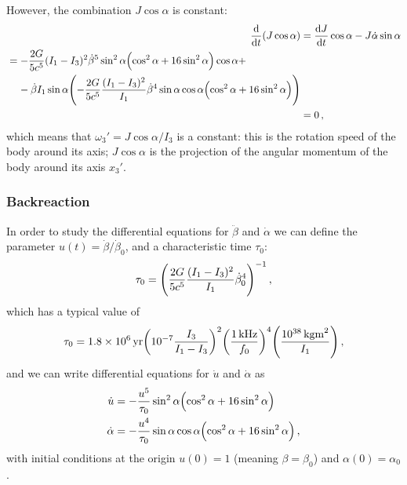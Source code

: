 \documentclass[main.tex]{subfiles}
\begin{document}
However, the combination \(J \cos \alpha \) is constant: 
%
\begin{align}
\dv{}{t} \qty(J \cos \alpha ) &= \dv{J}{t} \cos \alpha - J \dot{\alpha} \sin \alpha   \\
\begin{split}
&= - \frac{2G}{5c^{5}} (I_1-I_3)^2 \dot{\beta}^{5} \sin^2\alpha \qty(\cos^2\alpha  + 16 \sin^2\alpha ) \cos \alpha + \\
&\phantom{=}\ 
- \dot{\beta} I_1 \sin \alpha \qty(- \frac{2G}{5c^{5}} \frac{(I_1 - I_3 )^2}{I_1 } 
\dot{\beta}^{4} \sin \alpha \cos \alpha \qty(\cos^2\alpha + 16 \sin^2 \alpha ))
\end{split}  \\
&= 0
\,,
\end{align}
%
which means that \(\omega_{3}' = J \cos \alpha  / I_3 \) is a constant: this is the rotation speed of the body around its axis; \(J \cos \alpha \) is the projection of the angular momentum of the body around its axis \(x_3'\).


\subsubsection{Backreaction}

In order to study the differential equations for \(\ddot{\beta}\) and \(\dot{\alpha}\) we can define the parameter \(u(t) = \dot{\beta} / \dot{\beta}_{0}\), and a characteristic time \(\tau_0 \): 
%
\begin{align}
\tau_0  = \qty( \frac{2G}{5 c^{5}} \frac{(I_1 - I_3 )^2}{I_1  } \dot{\beta}_{0}^{4})^{-1}
\,,
\end{align}
%
which has a typical value of 
%
\begin{align}
\tau_0 = \SI{1.8e6}{yr} \qty(\num{e-7} \frac{I_3 }{I_1 - I_3 })^2 \qty( \frac{ \SI{1}{kHz}}{f_0 })^{4} \qty(\frac{\SI{e38}{kg m^2}}{I_1 })
\,,
\end{align}
%
and we can write differential equations for \(\dot{u}\) and \(\dot{\alpha}\) as 
%
\begin{align}
\dot{u} &= - \frac{u^{5}}{\tau_0 } \sin^2\alpha  \qty(\cos^2 \alpha + 16 \sin^2\alpha ) \\
\dot{\alpha} &= - \frac{ u^{4}}{\tau_0 } \sin \alpha \cos \alpha 
\qty(\cos^2 \alpha + 16 \sin^2\alpha )
\,,
\end{align}
%
with initial conditions at the origin \(u(0) = 1\) (meaning \(\beta = \beta_0 \)) and \(\alpha(0) = \alpha_0 \). 
\end{document}
